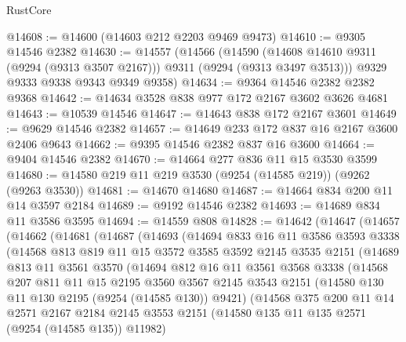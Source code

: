 \begin{lexlean}{RustCore}
\begin{coremodule}
@14608 := @14600 (@14603 @212 @2203 @9469 @9473)
@14610 := @9305 @14546 @2382
@14630 := @14557
    (@14566
      (@14590 (@14608 @14610 @9311 (@9294 (@9313 @3507 @2167))) @9311 (@9294 (@9313 @3497 @3513)))
      @9329
      @9333
      @9338
      @9343
      @9349
      @9358)
@14634 := @9364 @14546 @2382 @2382 @9368
@14642 := @14634 @3528 @838 @977 @172 @2167 @3602 @3626 @4681
@14643 := @10539 @14546
@14647 := @14643 @838 @172 @2167 @3601
@14649 := @9629 @14546 @2382
@14657 := @14649 @233 @172 @837 @16 @2167 @3600 @2406 @9643
@14662 := @9395 @14546 @2382 @837 @16 @3600
@14664 := @9404 @14546 @2382
@14670 := @14664 @277 @836 @11 @15 @3530 @3599
@14680 := @14580 @219 @11 @219 @3530 (@9254 (@14585 @219)) (@9262 (@9263 @3530))
@14681 := @14670 @14680
@14687 := @14664 @834 @200 @11 @14 @3597 @2184
@14689 := @9192 @14546 @2382
@14693 := @14689 @834 @11 @3586 @3595
@14694 := @14559 @808
@14828 := @14642
    (@14647
      (@14657
        (@14662
          (@14681
            (@14687
              (@14693
                (@14694
                  @833
                  @16
                  @11
                  @3586
                  @3593
                  @3338
                  (@14568
                    @813
                    @819
                    @11
                    @15
                    @3572
                    @3585
                    @3592
                    @2145
                    @3535
                    @2151
                    (@14689
                      @813
                      @11
                      @3561
                      @3570
                      (@14694
                        @812
                        @16
                        @11
                        @3561
                        @3568
                        @3338
                        (@14568
                          @207
                          @811
                          @11
                          @15
                          @2195
                          @3560
                          @3567
                          @2145
                          @3543
                          @2151
                          (@14580 @130 @11 @130 @2195 (@9254 (@14585 @130)) @9421)
                          (@14568
                            @375
                            @200
                            @11
                            @14
                            @2571
                            @2167
                            @2184
                            @2145
                            @3553
                            @2151
                            (@14580 @135 @11 @135 @2571 (@9254 (@14585 @135)) @11982)

\end{coremodule}
\end{lexlean}
